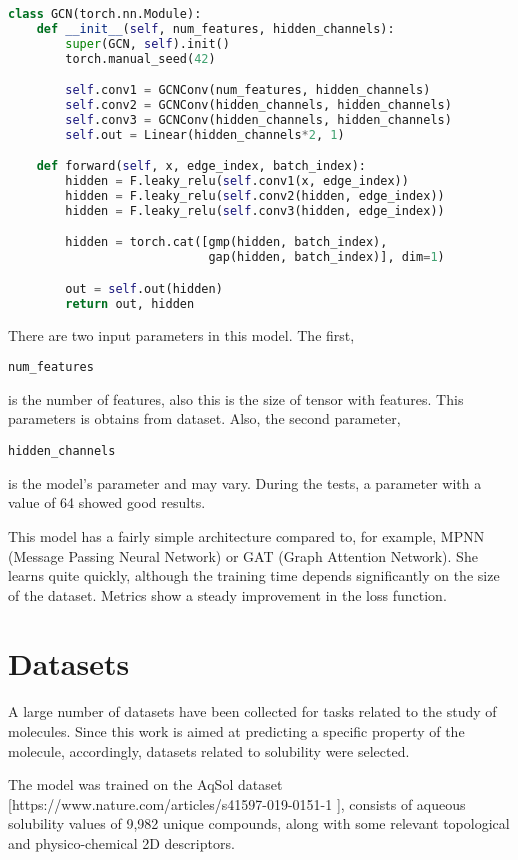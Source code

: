 \documentclass[a4paper,14pt]{article}
\begin{document}
\begin{lstlisting}[language=Python]
class GCN(torch.nn.Module):
    def __init__(self, num_features, hidden_channels):
        super(GCN, self).init()
        torch.manual_seed(42)

        self.conv1 = GCNConv(num_features, hidden_channels)
        self.conv2 = GCNConv(hidden_channels, hidden_channels)
        self.conv3 = GCNConv(hidden_channels, hidden_channels)
        self.out = Linear(hidden_channels*2, 1)

    def forward(self, x, edge_index, batch_index):
        hidden = F.leaky_relu(self.conv1(x, edge_index))
        hidden = F.leaky_relu(self.conv2(hidden, edge_index))
        hidden = F.leaky_relu(self.conv3(hidden, edge_index))

        hidden = torch.cat([gmp(hidden, batch_index), 
                            gap(hidden, batch_index)], dim=1)

        out = self.out(hidden)
        return out, hidden
\end{lstlisting}
There are two input parameters in this model. The first, \begin{verbatim}num_features\end{verbatim} is the number of features, also this is the size of tensor with features. This parameters is obtains from dataset.
Also, the second parameter, \begin{verbatim}hidden_channels\end{verbatim} is the model's parameter and may vary. During the tests, a parameter with a value of 64 showed good results.

This model has a fairly simple architecture compared to, for example, MPNN (Message Passing Neural Network) or GAT (Graph Attention Network). She learns quite quickly, although the training time depends significantly on the size of the dataset. Metrics show a steady improvement in the loss function.

\section{Datasets}
A large number of datasets have been collected for tasks related to the study of molecules. Since this work is aimed at predicting a specific property of the molecule, accordingly, datasets related to solubility were selected.

The model was trained on the AqSol dataset [https://www.nature.com/articles/s41597-019-0151-1 ], consists of aqueous solubility values of 9,982 unique compounds, along with some relevant topological and physico-chemical 2D descriptors. 
\end{document}
